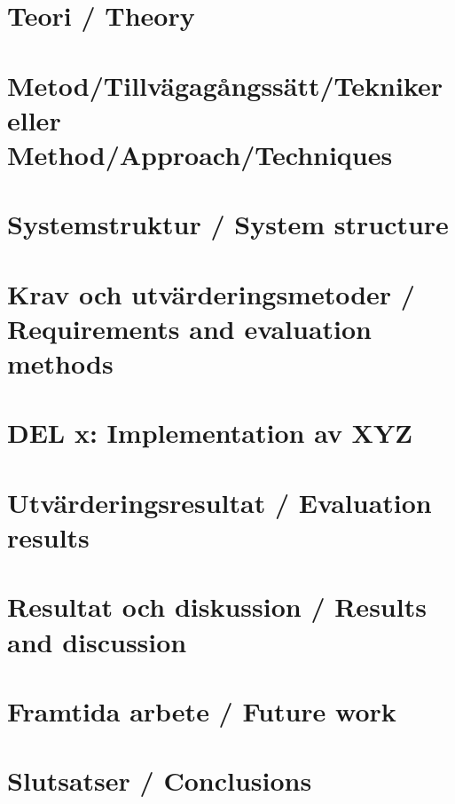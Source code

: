 \documentclass[a4paper,12pt]{article}
\begin{document}
\section{Teori / Theory}
\label{sec:teori}


\section{Metod/Tillvägagångssätt/Tekniker eller Method/Approach/Techniques}
\label{sec:metod}


\section{Systemstruktur / System structure}


\section{Krav och utvärderingsmetoder / Requirements and evaluation methods}
\label{sec:krav}


\section{DEL x: Implementation av XYZ}
\label{sec:del-x}


\section{Utvärderingsresultat / Evaluation results}


\section{Resultat och diskussion / Results and discussion}
\label{sec:resultat}


\section{Framtida arbete / Future work}
\label{sec:framtida}


\section{Slutsatser / Conclusions}
\label{sec:slutsatser}

\end{document}

